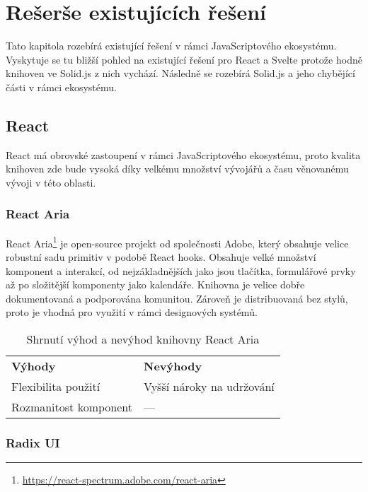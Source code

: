 \chapter{Rešerše existujících řešení}

Tato kapitola rozebírá existující řešení v rámci JavaScriptového ekosystému.
Vyskytuje se tu bližší pohled na existující řešení pro React a Svelte protože hodně knihoven ve Solid.js z nich vychází.
Následně se rozebírá Solid.js a jeho chybějící části v rámci ekosystému.

\section{React}

React má obrovské zastoupení v rámci JavaScriptového ekosystému, proto kvalita knihoven zde bude vysoká díky velkému množství vývojářů a času věnovanému vývoji v této oblasti.

\subsection{React Aria}

React Aria\footnote{\url{https://react-spectrum.adobe.com/react-aria}} je open-source projekt od společnosti Adobe, který obsahuje velice robustní sadu primitiv v podobě React hooks.
Obsahuje velké množství komponent a interakcí, od nejzákladnějších jako jsou tlačítka, formulářové prvky až po složitější komponenty jako kalendáře.
Knihovna je velice dobře dokumentovaná a podporována komunitou.
Zároveň je distribuovaná bez stylů, proto je vhodná pro využití v rámci designových systémů.

\begin{table}[ht]
    \begin{ctucolortab}
        \begin{tabularx}{\textwidth}{Y Y}
            \bfseries \textcolor{OK}{Výhody} & \bfseries \textcolor{NOT_OK}{Nevýhody} \\\Midrule{}
            Flexibilita použití              & Vyšší nároky na udržování              \\
            Rozmanitost komponent            & ---
        \end{tabularx}
    \end{ctucolortab}
    \caption{Shrnutí výhod a nevýhod knihovny React Aria}
\end{table}

\subsection{Radix UI}

